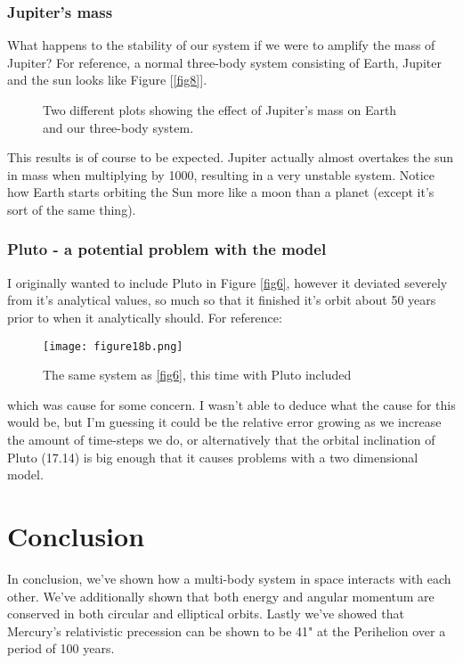 \documentclass{article}
\begin{document}
\subsubsection*{Jupiter's mass}
What happens to the stability of our system if we were to amplify the mass of Jupiter? For reference, a normal three-body system consisting of Earth, Jupiter and the sun looks like Figure [\ref{fig8}].
\begin{figure}[ht!] \label{fig12}
\centering
{}
\caption{Two different plots showing the effect of Jupiter's mass on Earth and our three-body system.}
\end{figure} \newline
This results is of course to be expected. Jupiter actually almost overtakes the sun in mass when multiplying by 1000, resulting in a very unstable system. Notice how Earth starts orbiting the Sun more like a moon than a planet (except it's sort of the same thing). \newpage
\subsubsection*{Pluto - a potential problem with the model}
I originally wanted to include Pluto in Figure \ref{fig6}, however it deviated severely from it's analytical values, so much so that it finished it's orbit about 50 years prior to when it analytically should. \newline
For reference:
\begin{figure}[ht!]
    \centering
    \texttt{[image: figure18b.png]}
    \caption{The same system as \ref{fig6}, this time with Pluto included}
    \label{fig13}
\end{figure} \newline
which was cause for some concern. I wasn't able to deduce what the cause for this would be, but I'm guessing it could be the relative error growing as we increase the amount of time-steps we do, or alternatively that the orbital inclination of Pluto (17.14\degree) is big enough that it causes problems with a two dimensional model.
\section{Conclusion}
In conclusion, we've shown how a multi-body system in space interacts with each other. We've additionally shown that both energy and angular momentum are conserved in both circular and elliptical orbits. \newline
Lastly we've showed that Mercury's relativistic precession can be shown to be 41" at the Perihelion over a period of 100 years.


\end{document}
